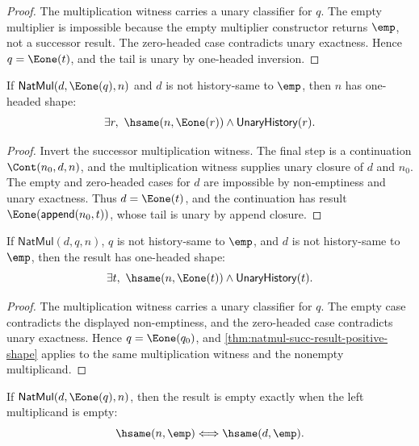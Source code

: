 \begin{proof}
The multiplication witness carries a unary classifier for $q$. The empty
multiplier is impossible because the empty multiplier constructor returns
$\emp$, not a successor result. The zero-headed case contradicts unary
exactness. Hence $q=\Eone(t)$, and the tail is unary by one-headed inversion.
\end{proof}
\begin{theorem}
\label{thm:natmul-succ-result-positive-shape}
If $\mathsf{NatMul}(d,\Eone(q),n)$ and $d$ is not history-same to
$\emp$, then $n$ has one-headed shape:
$$
\exists r,\ \hsame(n,\Eone(r))\wedge\mathsf{UnaryHistory}(r).
$$
\end{theorem}
\begin{proof}
Invert the successor multiplication witness. The final step is a continuation
$\Cont(n_0,d,n)$, and the multiplication witness supplies unary closure of
$d$ and $n_0$. The empty and zero-headed cases for $d$ are impossible by
non-emptiness and unary exactness. Thus $d=\Eone(t)$, and the continuation
has result $\Eone(\mathsf{append}(n_0,t))$, whose tail is unary by append
closure.
\end{proof}
\begin{theorem}
\label{thm:natmul-nonempty-multiplier-result-positive-shape}
If $\mathsf{NatMul}(d,q,n)$, $q$ is not history-same to $\emp$, and $d$ is not
history-same to $\emp$, then the result has one-headed shape:
$$
\exists t,\ \hsame(n,\Eone(t))\wedge\mathsf{UnaryHistory}(t).
$$
\end{theorem}
\begin{proof}
The multiplication witness carries a unary classifier for $q$. The empty case
contradicts the displayed non-emptiness, and the zero-headed case contradicts
unary exactness. Hence $q=\Eone(q_0)$, and
\autoref{thm:natmul-succ-result-positive-shape} applies to the same
multiplication witness and the nonempty multiplicand.
\end{proof}
\begin{theorem}
\label{thm:nat-mul-succ-result-empty-left-empty-iff}
If $\mathsf{NatMul}(d,\Eone(q),n)$, then the result is empty exactly when the
left multiplicand is empty:
$$
\hsame(n,\emp)\Longleftrightarrow \hsame(d,\emp).
$$
\end{theorem}
